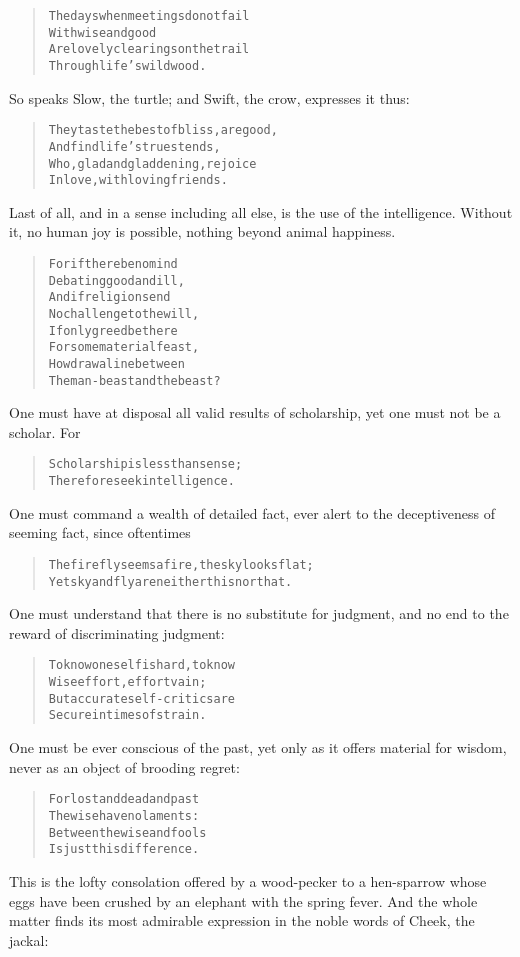 \documentclass[article, twoside, 10pt]{memoir}
\renewenvironment{verbatim}{%
\begin{quote}%
\vskip -10pt%
\begin{alltt}\normalfont\small}{\end{alltt}%
\end{quote}%
\vskip -10pt
} %
\begin{document}
\begin{verbatim}
The days when meetings do not fail
    With wise and good
Are lovely clearings on the trail
    Through life's wild wood.
\end{verbatim}
So speaks Slow, the turtle; and Swift, the crow, expresses it
thus:

\begin{verbatim}
They taste the best of bliss, are good,
    And find life's truest ends,
Who, glad and gladdening, rejoice
    In love, with loving friends.
\end{verbatim}
Last of all, and in a sense including all else, is the use of the
intelligence. Without it, no human joy is possible, nothing beyond
animal happiness.

\begin{verbatim}
For if there be no mind
    Debating good and ill,
And if religion send
    No challenge to the will,
If only greed be there
    For some material feast,
How draw a line between
    The man-beast and the beast?
\end{verbatim}
One must have at disposal all valid results of scholarship, yet one
must not be a scholar. For

\begin{verbatim}
Scholarship is less than sense;
Therefore seek intelligence.
\end{verbatim}
One must command a wealth of detailed fact, ever alert to the
deceptiveness of seeming fact, since oftentimes

\begin{verbatim}
The firefly seems a fire, the sky looks flat;
Yet sky and fly are neither this nor that.
\end{verbatim}
One must understand that there is no substitute for judgment, and
no end to the reward of discriminating judgment:

\begin{verbatim}
To know oneself is hard, to know
    Wise effort, effort vain;
But accurate self-critics are
    Secure in times of strain.
\end{verbatim}
One must be ever conscious of the past, yet only as it offers
material for wisdom, never as an object of brooding regret:

\begin{verbatim}
For lost and dead and past
    The wise have no laments:
Between the wise and fools
    Is just this difference.
\end{verbatim}
This is the lofty consolation offered by a wood-pecker to a
hen-sparrow whose eggs have been crushed by an elephant with the
spring fever. And the whole matter finds its most admirable
expression in the noble words of Cheek, the jackal:
\end{document}
